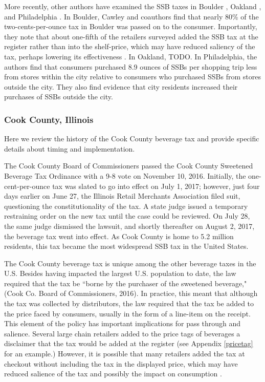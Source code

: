 \documentclass[12pt]{article}
\begin{document}
More recently, other authors have examined the SSB taxes in Boulder \parencite{cawley2020boulder}, Oakland \parencite{cawley2020oakland}, and Philadelphia \parencite{cawley2020philly}. In Boulder, Cawley and coauthors find that nearly 80\% of the two-cents-per-ounce tax in Boulder was passed on to the consumer. Importantly, they note that about one-fifth of the retailers surveyed added the SSB tax at the register rather than into the shelf-price, which may have reduced saliency of the tax, perhaps lowering its effectiveness \parencite{chetty2009salience}. In Oakland, TODO. In Philadelphia, the authors find that consumers purchased 8.9 ounces of SSBs per shopping trip less from stores within the city relative to consumers who purchased SSBs from stores outside the city. They also find evidence that city residents increased their purchases of SSBs outside the city.

\subsubsection{Cook County, Illinois}

Here we review the history of the Cook County beverage tax and provide specific details about timing and implementation.

The Cook County Board of Commissioners passed the Cook County Sweetened Beverage Tax Ordinance with a 9-8 vote on November 10, 2016. Initially, the one-cent-per-ounce tax was slated to go into effect on July 1, 2017; however, just four days earlier on June 27, the Illinois Retail Merchants Association filed suit, questioning the constitutionality of the tax. A state judge issued a temporary restraining order on the new tax until the case could be reviewed. On July 28, the same judge dismissed the lawsuit, and shortly thereafter on August 2, 2017, the beverage tax went into effect. As Cook County is home to 5.2 million residents, this tax became the most widespread SSB tax in the United States.

The Cook County beverage tax is unique among the other beverage taxes in the U.S. Besides having impacted the largest U.S. population to date, the law required that the tax be ``borne by the purchaser of the sweetened beverage," (Cook Co. Board of Commissioners, 2016). %
In practice, this meant that although the tax was collected by distributors, the law required that the tax be added to the price faced by consumers, usually in the form of a line-item on the receipt. This element of the policy has important implications for pass through and salience. Several large chain retailers added to the price tags of beverages a disclaimer that the tax would be added at the register (see Appendix \ref{pricetag} for an example.) However, it is possible that many retailers added the tax at checkout without including the tax in the displayed price, which may have reduced salience of the tax and possibly the impact on consumption \parencite{chetty2009salience}.
\end{document}
